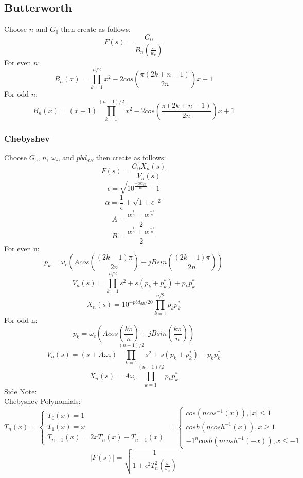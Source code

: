 \documentclass[11pt, oneside]{article}
\begin{document}

\subsection{Butterworth}


Choose $n$ and $G_0$ then create as follows:
\[ F(s) = \frac{G_0}{B_n(\frac{s}{w_c})}\]
For even $n$:
\[ B_n(x) = \prod_{k = 1}^{n/2}x^2 - 2cos(\frac{\pi(2k+n-1)}{2n})x+1\]
For odd $n$:
\[ B_n(x) = (x+1)\prod_{k = 1}^{(n-1)/2}x^2 - 2cos(\frac{\pi(2k+n-1)}{2n})x+1\]

\subsubsection{Chebyshev}
Choose $G_0$, $n$, $\omega_c$, and $pbd_{dB}$ then create as follows:\\
\[F(s) = \frac{G_0X_n(s)}{V_n(s)}\]
\[\epsilon = \sqrt{10^{\frac{-pbd_{dB}}{10}}-1}\]
\[\alpha = \frac{1}{\epsilon}+\sqrt{1+\epsilon^{-2}}\]
\[A = \frac{\alpha^{\frac{1}{n}} - \alpha^{\frac{-1}{n}}}{2}\]
\[B =\frac{\alpha^{\frac{1}{n}} + \alpha^{\frac{-1}{n}}}{2} \]
For even n:
\[p_k = \omega_c(Acos(\frac{(2k - 1)\pi}{2n})+jBsin(\frac{(2k-1)\pi}{2n}))\]
\[V_n(s) = \prod_{k = 1}^{n/2} s^2 + s(p_k+p_k^*)+p_kp_k^*\]
\[X_n(s) = 10^{-pbd_{dB}/20}\prod_{k = 1}^{n/2}p_kp_k^*\]
For odd n:
\[p_k = \omega_c(Acos(\frac{k\pi}{n})+jBsin(\frac{k\pi}{n}))\]
\[V_n(s) = (s+A\omega_c)\prod_{k = 1}^{(n-1)/2} s^2 + s(p_k+p_k^*)+p_kp_k^*\]
\[X_n(s) = A\omega_c\prod_{k = 1}^{(n-1)/2}p_kp_k^*\]
Side Note:\\
Chebyshev Polynomials:
\[T_n(x) = \left\{
                \begin{array}{ll}
                  T_0(x) = 1\\
                  T_1(x) = x\\
                  T_{n+1}(x) = 2xT_n(x) - T_{n-1}(x)
                \end{array}
              \right. =
               \left\{
                \begin{array}{ll}
                  cos (n cos^{-1}(x)), |x|\leq 1\\
                  cosh(ncosh^{-1}(x)), x\geq 1\\
                  -1^ncosh(ncosh^{-1}(-x)),x\leq -1
                \end{array}
              \right.\]
\[|F(s)| = \sqrt{\frac{1}{1+\epsilon^2T_n^2(\frac{\omega}{\omega_c})}}\]
\end{document}
